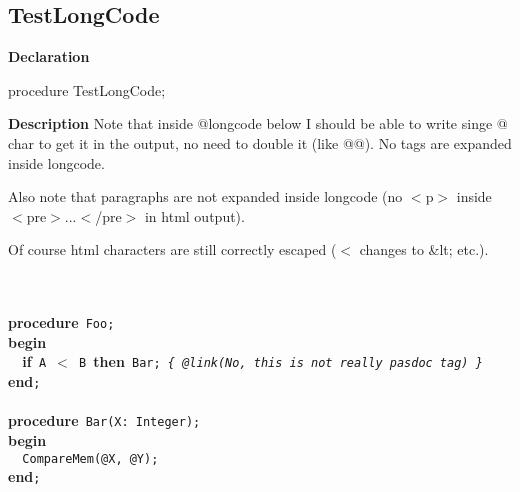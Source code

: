 \documentclass{report}
\begin{document}
\subsection*{TestLongCode}
\begin{list}{}{
\setlength{\itemindent}{0cm}
\setlength{\listparindent}{0cm}
\setlength{\leftmargin}{\evensidemargin}
\addtolength{\leftmargin}{\tmplength}
\settowidth{\labelsep}{X}
\addtolength{\leftmargin}{\labelsep}
\setlength{\labelwidth}{\tmplength}
}
\begin{flushleft}
\item[\textbf{Declaration}\hfill]
\begin{ttfamily}
procedure TestLongCode;\end{ttfamily}


\end{flushleft}
\par
\item[\textbf{Description}]
Note that inside @longcode below I should be able to write singe @ char to get it in the output, no need to double it (like @@). No tags are expanded inside longcode.

Also note that paragraphs are not expanded inside longcode (no {$<$}p{$>$} inside {$<$}pre{$>$}...{$<$}/pre{$>$} in html output).

Of course html characters are still correctly escaped ({$<$} changes to {\&}lt; etc.).

\texttt{\\\nopagebreak[3]
\\\nopagebreak[3]
}\textbf{procedure}\texttt{~Foo;\\\nopagebreak[3]
}\textbf{begin}\texttt{\\\nopagebreak[3]
~~}\textbf{if}\texttt{~A~{$<$}~B~}\textbf{then}\texttt{~Bar;~\textit{{\{}~@link(No,~this~is~not~really~pasdoc~tag)~{\}}}\\\nopagebreak[3]
}\textbf{end}\texttt{;\\\nopagebreak[3]
\\\nopagebreak[3]
}\textbf{procedure}\texttt{~Bar(X:~Integer);\\\nopagebreak[3]
}\textbf{begin}\texttt{\\\nopagebreak[3]
~~CompareMem(@X,~@Y);\\\nopagebreak[3]
}\textbf{end}\texttt{;\\
}

\end{list}
\end{document}
